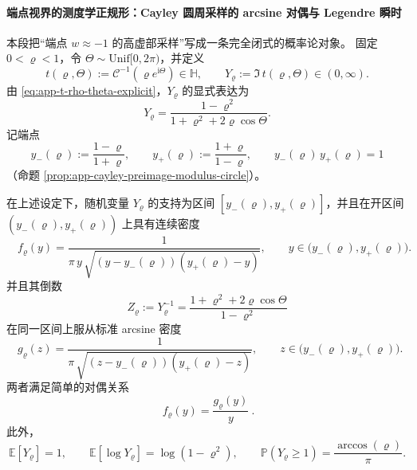 \paragraph{端点视界的测度学正规形：Cayley 圆周采样的 arcsine 对偶与 Legendre 瞬时}\label{par:app-endpoint-arcsine-legendre}
本段把“端点 \(w\approx-1\) 的高虚部采样”写成一条完全闭式的概率论对象。
固定 \(0<\varrho<1\)，令 \(\Theta\sim\mathrm{Unif}[0,2\pi)\)，并定义
\[
t(\varrho,\Theta):=\mathcal{C}^{-1}(\varrho e^{\mathrm{i}\Theta})\in\mathbb{H},
\qquad
Y_{\varrho}:=\Im\,t(\varrho,\Theta)\in(0,\infty).
\]
由 \eqref{eq:app-t-rho-theta-explicit}，\(Y_{\varrho}\) 的显式表达为
\[
Y_{\varrho}
=\frac{1-\varrho^2}{1+\varrho^2+2\varrho\cos\Theta}.
\]
记端点
\[
y_{-}(\varrho):=\frac{1-\varrho}{1+\varrho},
\qquad
y_{+}(\varrho):=\frac{1+\varrho}{1-\varrho},
\qquad
y_{-}(\varrho)\,y_{+}(\varrho)=1
\]
（命题 \ref{prop:app-cayley-preimage-modulus-circle}）。

\begin{theorem}\label{thm:app-endpoint-arcsine-duality}
在上述设定下，随机变量 \(Y_{\varrho}\) 的支持为区间 \([y_{-}(\varrho),y_{+}(\varrho)]\)，并且在开区间 \((y_{-}(\varrho),y_{+}(\varrho))\) 上具有连续密度
\begin{equation}\label{eq:app-endpoint-y-density-tilted-arcsine}
\boxed{\quad
f_{\varrho}(y)
=\frac{1}{\pi\,y\,\sqrt{(y-y_{-}(\varrho))(y_{+}(\varrho)-y)}},
\qquad y\in\bigl(y_{-}(\varrho),y_{+}(\varrho)\bigr).
\quad}
\end{equation}
并且其倒数
\[
Z_{\varrho}:=Y_{\varrho}^{-1}
=\frac{1+\varrho^2+2\varrho\cos\Theta}{1-\varrho^2}
\]
在同一区间上服从标准 arcsine 密度
\begin{equation}\label{eq:app-endpoint-z-density-arcsine}
\boxed{\quad
g_{\varrho}(z)
=\frac{1}{\pi\,\sqrt{(z-y_{-}(\varrho))(y_{+}(\varrho)-z)}},
\qquad z\in\bigl(y_{-}(\varrho),y_{+}(\varrho)\bigr).
\quad}
\end{equation}
两者满足简单的对偶关系
\[
\boxed{\ f_{\varrho}(y)=\frac{g_{\varrho}(y)}{y}\ }.
\]
此外，
\[
\mathbb{E}[Y_{\varrho}]=1,
\qquad
\mathbb{E}[\log Y_{\varrho}]=\log(1-\varrho^{2}),
\qquad
\mathbb{P}(Y_{\varrho}\ge 1)=\frac{\arccos(\varrho)}{\pi}.
\]
\end{theorem}

